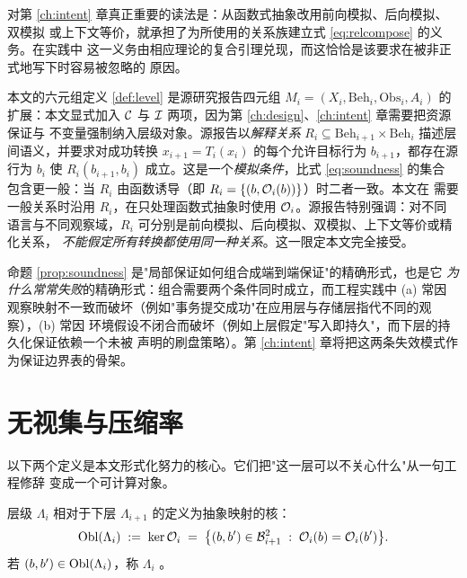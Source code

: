 \begin{remark}[关系情形下的条件 (a)]
对第 \ref{ch:intent} 章真正重要的读法是：从函数式抽象改用前向模拟、后向模拟、双模拟
或上下文等价，就承担了为所使用的关系族建立式 \eqref{eq:relcompose} 的义务。在实践中
这一义务由相应理论的复合引理兑现，而这恰恰是该要求在被非正式地写下时容易被忽略的
原因。
\end{remark}

\begin{remark}[与源研究报告记号的关系]\label{rmk:source}
本文的六元组定义 \ref{def:level} 是源研究报告四元组
$M_i = (X_i, \mathrm{Beh}_i, \mathrm{Obs}_i, A_i)$ 的扩展：本文显式加入
$\mathcal{C}$ 与 $\mathcal{I}$ 两项，因为第 \ref{ch:design}、\ref{ch:intent} 章需要把资源保证与
不变量强制纳入层级对象。源报告以\emph{解释关系}
$R_i \subseteq \mathrm{Beh}_{i+1} \times \mathrm{Beh}_i$ 描述层间语义，并要求对成功转换
$x_{i+1} = T_i(x_i)$ 的每个允许目标行为 $b_{i+1}$，都存在源行为 $b_i$ 使
$R_i(b_{i+1}, b_i)$ 成立。这是一个\emph{模拟条件}，比式 \eqref{eq:soundness} 的集合
包含更一般：当 $R_i$ 由函数诱导（即 $R_i = \{(b, \mathcal{O}_i(b))\}$）时二者一致。本文在
需要一般关系时沿用 $R_i$，在只处理函数式抽象时使用 $\mathcal{O}_i$。源报告特别强调：对不同
语言与不同观察域，$R_i$ 可分别是前向模拟、后向模拟、双模拟、上下文等价或精化关系，
\emph{不能假定所有转换都使用同一种关系}。这一限定本文完全接受。
\end{remark}

\begin{remark}\label{rmk:why-compose-fails}
命题 \ref{prop:soundness} 是"局部保证如何组合成端到端保证"的精确形式，也是它
\emph{为什么常常失败}的精确形式：组合需要两个条件同时成立，而工程实践中 (a) 常因
观察映射不一致而破坏（例如"事务提交成功"在应用层与存储层指代不同的观察），(b) 常因
环境假设不闭合而破坏（例如上层假定"写入即持久"，而下层的持久化保证依赖一个未被
声明的刷盘策略）。第 \ref{ch:intent} 章将把这两条失效模式作为保证边界表的骨架。
\end{remark}

\section{无视集与压缩率}\label{sec:oblivious}

以下两个定义是本文形式化努力的核心。它们把"这一层可以不关心什么"从一句工程修辞
变成一个可计算对象。

\begin{definition}[无视集]\label{def:oblivious}
层级 $\Lambda_i$ 相对于下层 $\Lambda_{i+1}$ 的定义为抽象映射的核：
\begin{equation}\label{eq:oblivious}
\operatorname{Obl}(\Lambda_i) \;:=\; \operatorname{ker} \mathcal{O}_i \;=\;
\bigl\{(b,b') \in \mathcal{B}_{i+1}^{2} \;:\; \mathcal{O}_i(b) = \mathcal{O}_i(b')\bigr\}.
\end{equation}
若 $(b,b') \in \operatorname{Obl}(\Lambda_i)$，称 $\Lambda_i$ 。
\end{definition}

